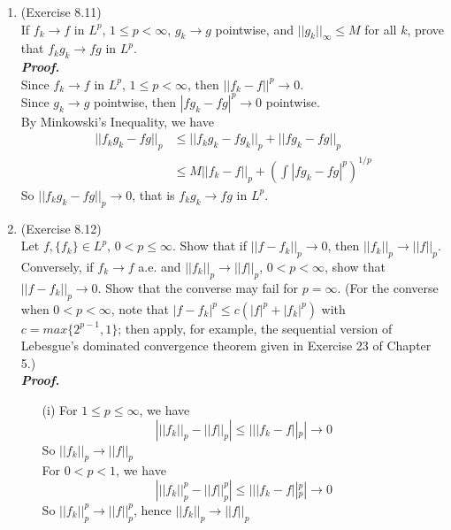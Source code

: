 \documentclass[a4paper,11pt]{article}
\begin{document}
\begin{enumerate}
	\item (Exercise 8.11)\\
		If $f_k \to f$ in $L^p$, $1 \leq p < \infty$, $g_k \to g$ pointwise, and $||g_k||_\infty \leq M$ for all $k$, prove that $f_k g_k \to fg$ in $L^p$.\\
	\newline
 	\textit{\textbf {Proof.}}\\
 		Since $f_k \to f$ in $L^p$, $1 \leq p < \infty$, then $||f_k - f||^p \to 0$.\\
 		Since $g_k \to g$ pointwise, then $|fg_k - fg|^p \to 0$ pointwise.\\
 		By Minkowski's Inequality, we have
 			$$\begin{aligned}
 			||f_k g_k - fg||_p
 			&\leq ||f_k g_k - f g_k||_p + ||f g_k  - fg||_p\\
 			&\leq M || f_k - f ||_p + \left( \int |f g_k - fg|^p \right)^{1/p}
 			\end{aligned}$$
 		So $||f_k g_k - fg||_p \to 0$, that is $f_k g_k \to fg$ in $L^p$.\\


	\item (Exercise 8.12)\\
		Let $f, \{f_k\} \in L^p$, $0 < p \leq \infty$. Show that if $||f - f_k||_p \to 0$, then $||f_k||_p \to ||f||_p$. Conversely, if $f_k \to f$ a.e. and $||f_k||_p \to ||f||_p$, $0 < p < \infty$, show that $||f - f_k||_p \to 0$. Show that the converse may fail for $p = \infty$. (For the converse when $0 < p < \infty$, note that $|f - f_k|^p \leq c(|f|^p + |f_k|^p )$ with $c = max \{ 2^{p-1}, 1 \}$; then apply, for example, the sequential version of Lebesgue's dominated convergence theorem given in Exercise 23 of Chapter 5.)\\
	\newline
 	\textit{\textbf {Proof.}}\\
 	\begin{enumerate}
 		\item [(i)]
 			For $1 \leq p \leq \infty$, we have
	 			$$\left| ||f_k||_p - ||f||_p \right|
	 			\leq |||f_k - f||_p| \to 0$$
	 	 	So $||f_k||_p \to ||f||_p$\\
	 	 	For $0 < p < 1$, we have
	 	 		$$\left| ||f_k||_p^p - ||f||_p^p \right|
	 			\leq |||f_k - f||_p^p| \to 0$$
	 	 	So $||f_k||_p^p \to ||f||_p^p$, hence $||f_k||_p \to ||f||_p$\\


\end{enumerate}
\end{enumerate}
\end{document}
